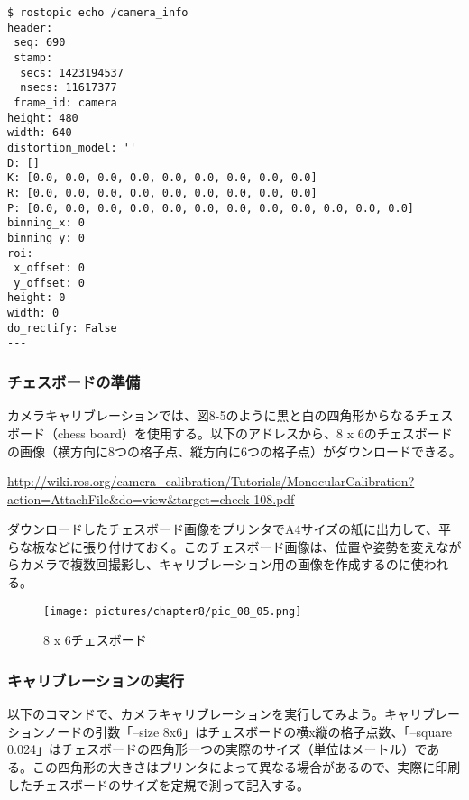 \begin{lstlisting}[language=ROS]
$ rostopic echo /camera_info
header:
 seq: 690
 stamp:
  secs: 1423194537
  nsecs: 11617377
 frame_id: camera
height: 480
width: 640
distortion_model: ''
D: []
K: [0.0, 0.0, 0.0, 0.0, 0.0, 0.0, 0.0, 0.0, 0.0]
R: [0.0, 0.0, 0.0, 0.0, 0.0, 0.0, 0.0, 0.0, 0.0]
P: [0.0, 0.0, 0.0, 0.0, 0.0, 0.0, 0.0, 0.0, 0.0, 0.0, 0.0, 0.0]
binning_x: 0
binning_y: 0
roi:
 x_offset: 0
 y_offset: 0
height: 0
width: 0
do_rectify: False
---
\end{lstlisting}

\subsubsection{チェスボードの準備}

カメラキャリブレーションでは、図8-5のように黒と白の四角形からなるチェスボード（chess board）を使用する。以下のアドレスから、8 x 6のチェスボードの画像（横方向に8つの格子点、縦方向に6つの格子点）がダウンロードできる。

\vspace{\baselineskip}
\url{http://wiki.ros.org/camera\_calibration/Tutorials/MonocularCalibration?action=AttachFile&do=view&target=check-108.pdf}
\vspace{\baselineskip}

ダウンロードしたチェスボード画像をプリンタでA4サイズの紙に出力して、平らな板などに張り付けておく。このチェスボード画像は、位置や姿勢を変えながらカメラで複数回撮影し、キャリブレーション用の画像を作成するのに使われる。

\begin{figure}[htp]
  \centering
  \texttt{[image: pictures/chapter8/pic\_08\_05.png]}
  \caption{8 x 6チェスボード}
\end{figure}

\subsubsection{キャリブレーションの実行}

以下のコマンドで、カメラキャリブレーションを実行してみよう。キャリブレーションノードの引数「--size 8x6」はチェスボードの横x縦の格子点数、「--square 0.024」はチェスボードの四角形一つの実際のサイズ（単位はメートル）である。この四角形の大きさはプリンタによって異なる場合があるので、実際に印刷したチェスボードのサイズを定規で測って記入する。

